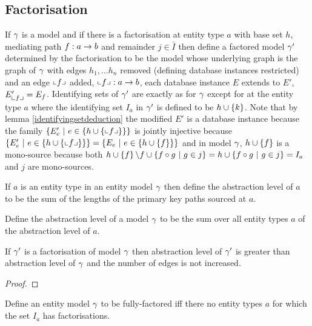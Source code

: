 \subsection{Factorisation}
\begin{definition}
If $\gamma$ is a model and if there is a factorisation at entity type $a$ with
base set $h$, mediating path $f: a \rightarrow b$ and remainder $j \in \bar{I}$ then define
a factored model $\gamma'$ determined by the factorisation to be the model
whose underlying graph is the graph of $\gamma$ with edges $h_1,...h_n$ removed 
(defining database instances restricted) and an edge $\left\llcorner f\right\lrcorner$ added, $\left\llcorner f\right\lrcorner:a \rightarrow b$, each database instance $E$ extends to $E'$, $E'_{\left\llcorner f\right\lrcorner} = E_f$.
Identifying sets of $\gamma'$ are exactly as for $\gamma$ except for at the entity
type $a$ where the identifying set $I_a$ in $\gamma'$ is defined to be $h \cup \left\{k\right\}$.
Note that by lemma \ref{identifyingsetdeduction} the modified $E'$ is a database instance because the family 
$\left\{E'_e \ \middle|\ e \in \left\{h \cup \left\{\left\llcorner f\right\lrcorner\right\}\right\}\right\}$ is jointly injective because 
$\left\{E'_e \ \middle|\ e \in \left\{h \cup \left\{\left\llcorner f\right\lrcorner\right\}\right\}\right\} =\left\{E_e \ \middle|\ e \in \left\{h \cup \left\{f\right\}\right\}\right\}$
and in model $\gamma$, $h \cup \left\{f\right\}$ is a mono-source because both
$h \cup \left\{f\right\} \backslash f \cup \left\{f \circ g \ \middle|\ g \in j\right\}
=h  \cup \left\{f \circ g \ \middle|\ g \in j\right\}=I_a$ and $j$ are  mono-sources.


\end{definition}

\begin{definition}
If $a$ is an entity type in an entity model $\gamma$ then define the abstraction
level of $a$ to be the sum of the lengths of the primary key paths sourced at $a$.
\end{definition}


\begin{definition}
Define  the abstraction level of a model $\gamma$ to be
the sum over all entity types $a$ of the abstraction level of $a$.
\end{definition}

\begin{lemma}
If $\gamma'$ is a factorisation of model $\gamma$ then abstraction level 
of $\gamma'$ is greater than abstraction level of $\gamma$ and the number of edges
is not increased. 
\end{lemma}
\begin{proof}
\end{proof}

\begin{definition}
Define an entity model $\gamma$ to be fully-factored iff there no entity types $a$
for which the set $I_a$ has  factorisations.
\end{definition}

